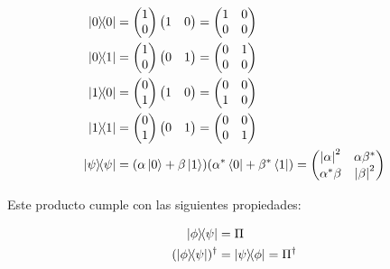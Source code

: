 \begin{align*}
    \ketbra{0}{0} &= \begin{pmatrix} 1 \\ 0 \end{pmatrix} \begin{pmatrix} 1 & 0 \end{pmatrix} = \begin{pmatrix} 1 & 0 \\ 0 & 0 \end{pmatrix} \\
    \ketbra{0}{1} &= \begin{pmatrix} 1 \\ 0 \end{pmatrix} \begin{pmatrix} 0 & 1 \end{pmatrix} = \begin{pmatrix} 0 & 1 \\ 0 & 0 \end{pmatrix} \\
    \ketbra{1}{0} &= \begin{pmatrix} 0 \\ 1 \end{pmatrix} \begin{pmatrix} 1 & 0 \end{pmatrix} = \begin{pmatrix} 0 & 0 \\ 1 & 0 \end{pmatrix} \\
    \ketbra{1}{1} &= \begin{pmatrix} 0 \\ 1 \end{pmatrix} \begin{pmatrix} 0 & 1 \end{pmatrix} = \begin{pmatrix} 0 & 0 \\ 0 & 1 \end{pmatrix} \\
    \ketbra{\psi}{\psi} &= (\alpha \ket{0} + \beta \ket{1})(\alpha^* \bra{0} + \beta^* \bra{1}) = \begin{pmatrix} \abs{\alpha}^2 & \alpha \beta^* \\ \alpha^* \beta & \abs{\beta}^2 \end{pmatrix}
\end{align*}

Este producto cumple con las siguientes propiedades:

\begin{align}
    \ketbra{\phi}{\psi} &= \Pi \\
    (\ketbra{\phi}{\psi})^\dagger &= \ketbra{\psi}{\phi} = \Pi^\dagger
\end{align}

